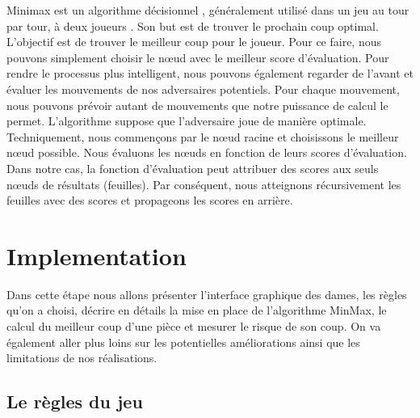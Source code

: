 \documentclass[11pt]{article} %
\begin{document}
Minimax est un algorithme décisionnel , généralement utilisé dans un jeu au tour par tour, à deux joueurs . Son but est de trouver le prochain coup optimal.
L'objectif est de trouver le meilleur coup pour le joueur. Pour ce faire, nous pouvons simplement choisir le nœud avec le meilleur score d’évaluation. Pour rendre le processus plus intelligent, nous pouvons également regarder de l’avant et évaluer les mouvements de nos adversaires potentiels.
Pour chaque mouvement, nous pouvons prévoir autant de mouvements que notre puissance de calcul le permet. L’algorithme suppose que l’adversaire joue de manière optimale.
Techniquement, nous commençons par le nœud racine et choisissons le meilleur nœud possible. Nous évaluons les nœuds en fonction de leurs scores d’évaluation. Dans notre cas, la fonction d’évaluation peut attribuer des scores aux seuls nœuds de résultats (feuilles).
Par conséquent, nous atteignons récursivement les feuilles avec des scores et propageons les scores en arrière.


\section{Implementation}
Dans cette étape nous allons présenter l’interface graphique des dames, les règles qu’on a choisi, décrire en détails la mise en place de l’algorithme MinMax, le calcul du meilleur coup  d’une pièce et mesurer le risque de son coup. On va également aller plus loins sur les potentielles améliorations ainsi que les limitations de nos réalisations.



\subsection{Le règles du jeu}
\end{document}
